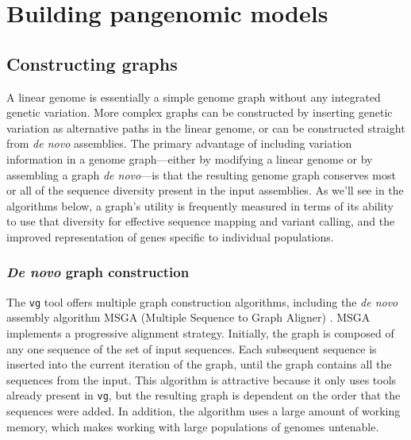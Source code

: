 \section{Building pangenomic models}

\begin{comment}
PanTools https://github.com/Sheikhizadeh/pantools, https://www.ncbi.nlm.nih.gov/pmc/articles/PMC6158922/ \cite{Sheikhizadeh_Anari_2018}
TwoPaCo https://github.com/medvedevgroup/TwoPaCo, https://academic.oup.com/bioinformatics/article/33/24/4024/2725383 \cite{Minkin_2016}
McCortex https://github.com/mcveanlab/mccortex, https://www.ncbi.nlm.nih.gov/pubmed/29554215 and CortexJDK https://github.com/mcveanlab/CortexJDK, http://europepmc.org/abstract/PPR/PPR85394 from McVean's lab. \cite{Turner_2018}
LOGAN https://github.com/TonyBolger/LOGAN, https://www.biorxiv.org/content/10.1101/175976v1 \cite{Bolger_2017}
REVEAL https://github.com/jasperlinthorst/reveal \cite{linthorst2015scalable}
Bifrost \cite{holley2019bifrost}
\end{comment}

\subsection{Constructing graphs}

A linear genome is essentially a simple genome graph without any integrated genetic variation. 
More complex graphs can be constructed by inserting genetic variation as alternative paths in the linear genome, or can be constructed straight from \textit{de novo} assemblies. 
The primary advantage of including variation information in a genome graph---either by modifying a linear genome or by assembling a graph \textit{de novo}---is that the resulting genome graph conserves most or all of the sequence diversity present in the input assemblies. 
As we'll see in the algorithms below, a graph's utility is frequently measured in terms of its ability to use that diversity for effective sequence mapping and variant calling, and the improved representation of genes specific to individual populations.

\subsubsection{\textit{De novo} graph construction}

The \texttt{vg} tool offers multiple graph construction algorithms, including the \textit{de novo} assembly algorithm MSGA (Multiple Sequence to Graph Aligner) \cite{Garrison_2018,Novak_2017a}. 
MSGA implements a progressive alignment strategy.
Initially, the graph is composed of any one sequence of the set of input sequences.
Each subsequent sequence is inserted into the current iteration of the graph, until the graph contains all the sequences from the input.
This algorithm is attractive because it only uses tools already present in \texttt{vg}, but the resulting graph is dependent on the order that the sequences were added.
In addition, the algorithm uses a large amount of working memory, which makes working with large populations of genomes untenable.

